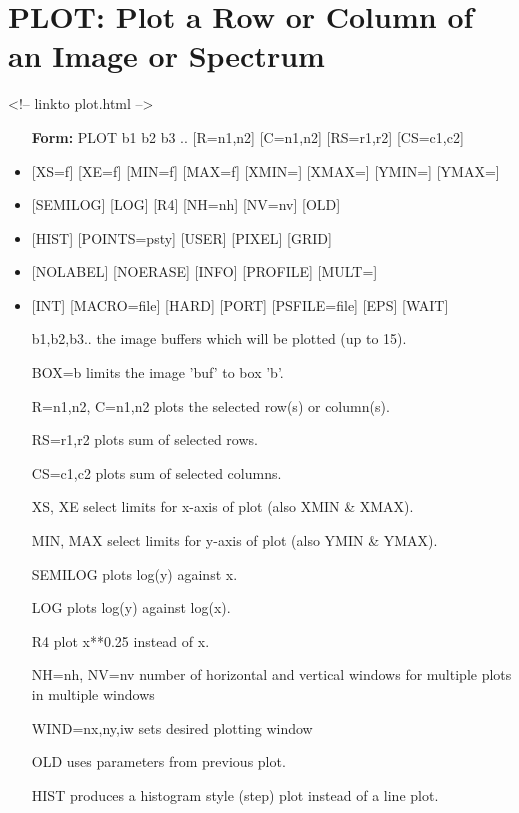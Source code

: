 \section{PLOT: Plot a Row or Column of an Image or Spectrum}
\begin{rawhtml}
<!-- linkto plot.html -->
\end{rawhtml}
\begin{itemize}
  \item[\textbf{Form: } PLOT b1 b2 b3 .. {[R=n1,n2]} {[C=n1,n2]}
       {[RS=r1,r2]} {[CS=c1,c2]}\hfill]{}
  \item{{[XS=f]} {[XE=f]} {[MIN=f]} {[MAX=f]} {[XMIN=]} {[XMAX=]} 
        {[YMIN=]} {[YMAX=]}}
  \item{{[SEMILOG]} {[LOG]} {[R4]} {[NH=nh]} {[NV=nv]} {[OLD]}}
  \item{{[HIST]} {[POINTS=psty]} {[USER]} {[PIXEL]} {[GRID]} }
  \item{{[NOLABEL]} {[NOERASE]} {[INFO]} {[PROFILE]} {[MULT=]} }
  \item{{[INT]} {[MACRO=file]} {[HARD]} {[PORT]} {[PSFILE=file]} {[EPS]} 
       {[WAIT]} }
  \item[b1,b2,b3..]{the image buffers which will be plotted (up to 15).}
  \item[BOX=b]{limits the image 'buf' to box 'b'.}
  \item[R=n1,n2, C=n1,n2]{plots the selected row(s) or column(s).}
  \item[RS=r1,r2]{plots sum of selected rows.}
  \item[CS=c1,c2]{plots sum of selected columns.}
  \item[XS, XE]{select limits for x-axis of plot (also XMIN \& XMAX).}
  \item[MIN, MAX]{select limits for y-axis of plot (also YMIN \& YMAX).}
  \item[SEMILOG]{plots log(y) against x.}
  \item[LOG]{plots log(y) against log(x).}
  \item[R4      ]{plot x**0.25 instead of x.}
  \item[NH=nh, NV=nv ]{number of horizontal and vertical windows
       for multiple plots in multiple windows}
  \item[WIND=nx,ny,iw]{sets desired plotting window}
  \item[OLD]{uses parameters from previous plot.}
  \item[HIST]{produces a histogram style (step) plot instead of a line plot.}

\end{itemize}
